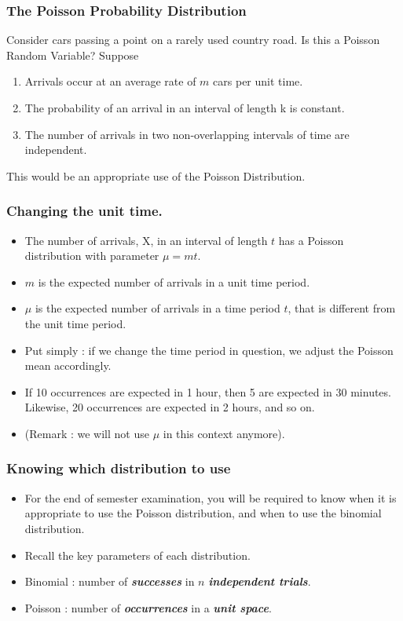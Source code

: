 


\begin{frame}
\frametitle{The Poisson Probability Distribution}
Consider cars passing a point on a rarely used country road. Is this a Poisson Random Variable?
Suppose
\begin{enumerate}
\item Arrivals occur at an average rate of $m$ cars per unit time.
\item The probability of an arrival in an interval of length k
is constant.
\item The number of arrivals in two non-overlapping
intervals of time are independent.
\end{enumerate}
This would be an appropriate use of the Poisson Distribution.
\end{frame}

\begin{frame}
\frametitle{Changing the unit time.}

\begin{itemize}
\item The number of arrivals, X, in an interval of length $t$ has a
Poisson distribution with parameter $\mu = mt$.
\item $m$ is the expected number of arrivals in a unit time period.
\item $\mu$ is the expected number of arrivals in a time period $t$, that is different from the unit time period.
\item Put simply : if we change the time period in question, we adjust the Poisson mean accordingly.
\item If 10 occurrences are expected in 1 hour, then 5 are expected in 30 minutes. Likewise, 20 occurrences are expected in 2 hours, and so on.
\item (Remark : we will not use $\mu$ in this context anymore).
\end{itemize}
\end{frame}



\begin{frame}
\frametitle{Knowing which distribution to use}
\begin{itemize}
\item For the end of semester examination, you will be required to know when it is appropriate to use the Poisson distribution, and when to use the binomial distribution.
\item Recall the key parameters of each distribution.
\item Binomial : number of \textbf{\emph{successes}} in $n$ \textbf{\emph{independent trials}}.
\item Poisson : number of \textbf{\emph{occurrences}} in a \textbf{\emph{unit space}}.
\end{itemize}
\end{frame}


